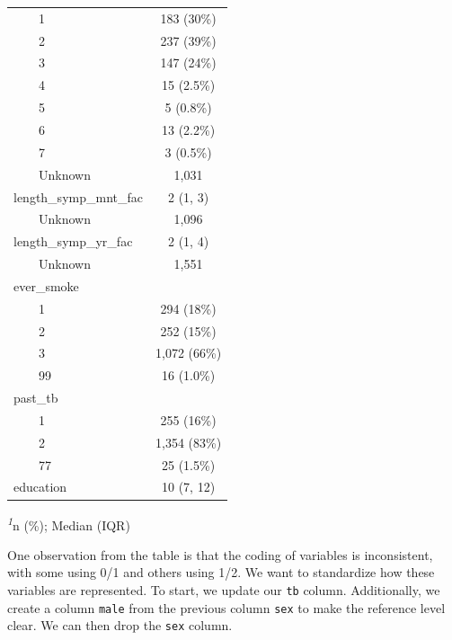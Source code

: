 \documentclass[
  letterpaper,
]{latex/krantz}
\begin{document}
\begin{longtable*}{lc}
    1 & 183 (30\%) \\ 
    2 & 237 (39\%) \\ 
    3 & 147 (24\%) \\ 
    4 & 15 (2.5\%) \\ 
    5 & 5 (0.8\%) \\ 
    6 & 13 (2.2\%) \\ 
    7 & 3 (0.5\%) \\ 
    Unknown & 1,031 \\ 
length\_symp\_mnt\_fac & 2 (1, 3) \\ 
    Unknown & 1,096 \\ 
length\_symp\_yr\_fac & 2 (1, 4) \\ 
    Unknown & 1,551 \\ 
ever\_smoke &  \\ 
    1 & 294 (18\%) \\ 
    2 & 252 (15\%) \\ 
    3 & 1,072 (66\%) \\ 
    99 & 16 (1.0\%) \\ 
past\_tb &  \\ 
    1 & 255 (16\%) \\ 
    2 & 1,354 (83\%) \\ 
    77 & 25 (1.5\%) \\ 
education & 10 (7, 12) \\ 
\bottomrule
\end{longtable*}
\begin{minipage}{\linewidth}
\textsuperscript{\textit{1}}n (\%); Median (IQR)\\
\end{minipage}

One observation from the table is that the coding of variables is
inconsistent, with some using 0/1 and others using 1/2. We want to
standardize how these variables are represented. To
start, we update our \texttt{tb} column. Additionally, we create a
column \texttt{male} from the previous column \texttt{sex} to make the
reference level clear. We can then drop the \texttt{sex} column.
\end{document}
